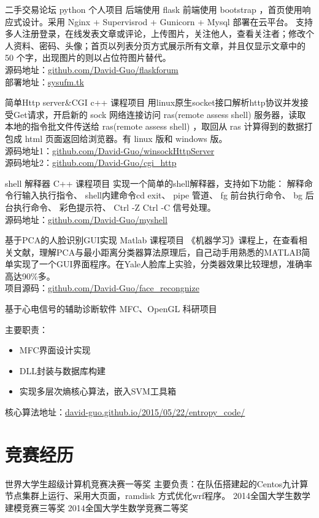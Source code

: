 \documentclass[14pt,a4paper]{moderncv}
\begin{document}
{二手交易论坛}
{python}
{个人项目}{}
{后端使用 flask 前端使用 bootstrap ，首页使用响应式设计。采用 Nginx + Supervisrod + Gunicorn + Mysql 部署在云平台。
支持多人注册登录，在线发表文章或评论，上传图片，关注他人，查看关注者；修改个人资料、密码、头像；首页以列表分页方式展示所有文章，并且仅显示文章中的 50 个字，出现图片的则以占位符图片替代。
\\源码地址：\url{github.com/David-Guo/flaskforum}
\\部署地址：\url{sysufm.tk}}

{简单Http server\&CGI}
{c++}
{课程项目}{}
{用linux原生socket接口解析http协议并发接受Get请求，开启新的 sock 网络连接访问 ras(remote assess shell) 服务器，读取本地的指令批文件传送给 ras(remote assess shell) ，取回从 ras 计算得到的数据打包成 html 页面返回给浏览器。有 linux 版和 windows 版。
\\源码地址1：\url{github.com/David-Guo/winsockHttpServer}
\\源码地址2：\url{github.com/David-Guo/cgi_http}}

{shell 解释器}
{C++}
{课程项目}{}
{实现一个简单的shell解释器，支持如下功能：
  	解释命令行输入执行指令、
    shell内建命令cd exit、
    pipe 管道、
    fg 前台执行命令、
    bg 后台执行命令、
    彩色提示符、
    Ctrl -Z Ctrl -C 信号处理。
\\源码地址：\url{github.com/David-Guo/myshell}}

{基于PCA的人脸识别GUI实现}
{Matlab}
{课程项目}{}
{《机器学习》课程上，在查看相关文献，理解PCA与最小距离分类器算法原理后，自己动手用熟悉的MATLAB简单实现了一个GUI界面程序。在Yale人脸库上实验，分类器效果比较理想，准确率高达90\%多。
\\项目源码：\url{github.com/David-Guo/face_recongnize}}

{基于心电信号的辅助诊断软件}
{MFC、OpenGL}
{科研项目}{}
{主要职责：
\begin{itemize}
	\item MFC界面设计实现
	\item DLL封装与数据库构建
	\item 实现多层次熵核心算法，嵌入SVM工具箱
\end{itemize}
核心算法地址：{\url{david-guo.github.io/2015/05/22/entropy_code/}}}

\section{竞赛经历}
{世界大学生超级计算机竞赛}{}{}{决赛一等奖}
{主要负责：在队伍搭建起的Centos九计算节点集群上运行、采用大页面，ramdisk 方式优化wrf程序。}
{2014全国大学生数学建模竞赛}{}{}{三等奖}{}
{2014全国大学生数学竞赛}{}{}{二等奖}{}
\end{document}
